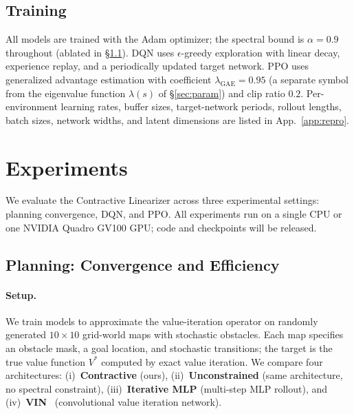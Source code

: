 \documentclass{article}
\newcommand{\spb}{\alpha}                    %
\newcommand{\eigs}{\lambda}                  %
\begin{document}
\subsection{Training}

All models are trained with the Adam optimizer; the spectral bound is
$\spb = 0.9$ throughout (ablated in \S\ref{sec:exp_planning}).
DQN uses $\epsilon$-greedy exploration with linear decay, experience replay,
and a periodically updated target network.
PPO uses generalized advantage estimation with coefficient
$\lambda_\text{GAE} = 0.95$ (a separate symbol from the eigenvalue function
$\eigs(s)$ of \S\ref{sec:param}) and clip ratio $0.2$.
Per-environment learning rates, buffer sizes, target-network periods, rollout
lengths, batch sizes, network widths, and latent dimensions are listed in
App.~\ref{app:repro}.

\section{Experiments}
\label{sec:experiments}

We evaluate the Contractive Linearizer across three experimental settings:
planning convergence, DQN, and PPO.
All experiments run on a single CPU or one NVIDIA Quadro GV100 GPU;
code and checkpoints will be released.

\subsection{Planning: Convergence and Efficiency}
\label{sec:exp_planning}

\paragraph{Setup.}
We train models to approximate the value-iteration operator on randomly generated
$10\!\times\!10$ grid-world maps with stochastic obstacles.
Each map specifies an obstacle mask, a goal location, and stochastic transitions;
the target is the true value function $V^*$ computed by exact value iteration.
We compare four architectures: (i)~\textbf{Contractive} (ours),
(ii)~\textbf{Unconstrained} (same architecture, no spectral constraint),
(iii)~\textbf{Iterative MLP} (multi-step MLP rollout), and
(iv)~\textbf{VIN}~\citep{tamar2016value} (convolutional value iteration network).
\end{document}
